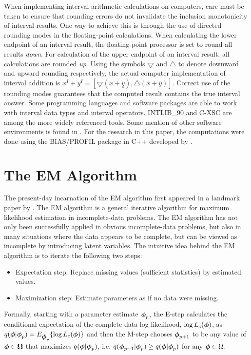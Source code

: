 When implementing interval arithmetic calculations on computers, care must
be taken to ensure that rounding errors do not invalidate the 
inclusion monotonicity
of interval results.  One way to achieve this is through the
use of directed rounding modes in the floating-point calculations.  When 
calculating the lower endpoint of an interval result, the floating-point
processor is set to round all results {\it down}. For calculation of the
upper endpoint of an interval result, all calculations are rounded
{\it up}.  Using the symbols $\bigtriangledown$ and $\bigtriangleup$ to denote 
downward and upward rounding 
respectively, the actual computer implementation of interval addition is
$x^I + y^I = [\bigtriangledown (\underline{x}+\underline{y}),
              \bigtriangleup(\overline{x} + \overline{y})] $.
Correct use of the rounding modes guarantees that the computed
result contains the true interval answer.  
Some programming languages and software packages are able to work with
interval data types and interval operators. INTLIB\_90 and C-XSC are among the
more widely referenced tools.  Some mention of other software environments 
is found in \cite{KearfottBook}.  For the research in this paper, the
computations were done using the 
BIAS/PROFIL package in C++ developed by \cite{Knu93b}.

\section{The EM Algorithm}\label{section:em}

The present-day incarnation of
the EM algorithm first appeared in a landmark paper by \cite{DLR}.
The EM algorithm is a general iterative algorithm for maximum likelihood
estimation in incomplete-data problems.  The EM algorithm has not only been
successfully applied in obvious incomplete-data problems, but also in many
situations where the data appears to be complete, but can be viewed as
incomplete by introducing latent variables.  
The intuitive idea behind the EM algorithm is to iterate the 
following two steps:
\begin{itemize}
\item [] Expectation step: Replace missing values (sufficient statistics) by estimated
values.
\item [] Maximization step: Estimate parameters as if no data were missing.
\end{itemize}
Formally, starting with a parameter
estimate $\mbox{\boldmath $\phi$}_p$, the E-step calculates the
conditional expectation of the complete-data log likelihood, 
$\log L_c(\mbox{\boldmath $\phi$})$, as
$q(\mbox{\boldmath $\phi$} | \mbox{\boldmath $\phi$}_p) = E_{\mbox{\boldmath $\phi$}_p} \{ \log L_c(\mbox{\boldmath $\phi$}) \}$
and then the M-step chooses 
$\mbox{\boldmath $\phi$}_{p+1}$ to be any value of $\mbox{\boldmath $\phi$} \in \mbox{\boldmath $\Omega$}$ that 
maximizes $q(\mbox{\boldmath $\phi$} | \mbox{\boldmath $\phi$}_p)$, i.e.
$q(\mbox{\boldmath $\phi$}_{p+1} | \mbox{\boldmath $\phi$}_p) \geq q(\mbox{\boldmath $\phi$} | \mbox{\boldmath $\phi$}_p)$ for any 
$\mbox{\boldmath $\phi$} \in \Omega$.

